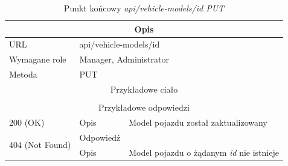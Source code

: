 \documentclass[eng,printmode,openany]{mgr}
\begin{document}
\begin{table}[H]
	\caption{Punkt końcowy \textit{api/vehicle-models/id PUT}}
	\begin{tabularx}{\textwidth}{|l|l|X|}
		\hline
		\multicolumn{3}{|c|}{Opis}                         						\\ \hline
		URL                       & \multicolumn{2}{l|}{api/vehicle-models/id} 	\\ \hline
		Wymagane role             & \multicolumn{2}{l|}{Manager, Administrator} \\ \hline
		Metoda                    & \multicolumn{2}{l|}{PUT} 					\\ \hline
		\multicolumn{3}{|c|}{Przykładowe ciało}         						\\ \hline
		\multicolumn{3}{|c|}{} 												\\ \hline
		\multicolumn{3}{|c|}{Przykładowe odpowiedzi}                   																		\\ \hline
		200 (OK)			& Opis         	& Model pojazdu został zaktualizowany 															\\ \hline
		\multirow{2}{*}{404 (Not Found)} 	& Odpowiedź     &    \\ \cline{2-3} 
		& Opis          & Model pojazdu o żądanym \textit{id} nie istnieje  											\\ \hline
	\end{tabularx}
\end{table}
\end{document}
